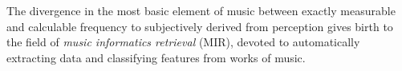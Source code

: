 The divergence in the most basic element of music between exactly measurable and calculable frequency to subjectively derived from perception gives birth to the field of \textit{music informatics retrieval} (MIR), devoted to automatically extracting data and classifying features from works of music.